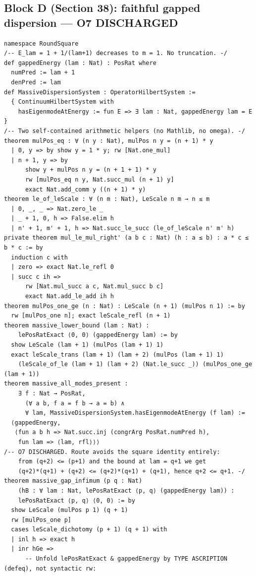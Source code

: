 \documentclass[11pt,a4paper]{article}
\theoremstyle{plain}
\theoremstyle{definition}
\theoremstyle{remark}
\renewcommand{\_}{\oldunderscore\allowbreak}
\begin{document}
\subsection{Block D (Section 38): faithful gapped dispersion --- O7 DISCHARGED}
\begin{lstlisting}
namespace RoundSquare
/-- E_lam = 1 + 1/(lam+1) decreases to m = 1. No truncation. -/
def gappedEnergy (lam : Nat) : PosRat where
  numPred := lam + 1
  denPred := lam
def MassiveDispersionSystem : OperatorHilbertSystem :=
  { ContinuumHilbertSystem with
    hasEigenmodeAtEnergy := fun E => ∃ lam : Nat, gappedEnergy lam = E }
/-- Two self-contained arithmetic helpers (no Mathlib, no omega). -/
theorem mulPos_eq : ∀ (n y : Nat), mulPos n y = (n + 1) * y
  | 0, y => by show y = 1 * y; rw [Nat.one_mul]
  | n + 1, y => by
      show y + mulPos n y = (n + 1 + 1) * y
      rw [mulPos_eq n y, Nat.succ_mul (n + 1) y]
      exact Nat.add_comm y ((n + 1) * y)
theorem le_of_leScale : ∀ (n m : Nat), LeScale n m → n ≤ m
  | 0, _, _ => Nat.zero_le _
  | _ + 1, 0, h => False.elim h
  | n' + 1, m' + 1, h => Nat.succ_le_succ (le_of_leScale n' m' h)
private theorem mul_le_mul_right' (a b c : Nat) (h : a ≤ b) : a * c ≤ b * c := by
  induction c with
  | zero => exact Nat.le_refl 0
  | succ c ih =>
      rw [Nat.mul_succ a c, Nat.mul_succ b c]
      exact Nat.add_le_add ih h
theorem mulPos_one_ge (n : Nat) : LeScale (n + 1) (mulPos n 1) := by
  rw [mulPos_one n]; exact leScale_refl (n + 1)
theorem massive_lower_bound (lam : Nat) :
    lePosRatExact ⟨0, 0⟩ (gappedEnergy lam) := by
  show LeScale (lam + 1) (mulPos (lam + 1) 1)
  exact leScale_trans (lam + 1) (lam + 2) (mulPos (lam + 1) 1)
    (leScale_of_le (lam + 1) (lam + 2) (Nat.le_succ _)) (mulPos_one_ge (lam + 1))
theorem massive_all_modes_present :
    ∃ f : Nat → PosRat,
      (∀ a b, f a = f b → a = b) ∧
      ∀ lam, MassiveDispersionSystem.hasEigenmodeAtEnergy (f lam) :=
  ⟨gappedEnergy,
   ⟨fun a b h => Nat.succ.inj (congrArg PosRat.numPred h),
    fun lam => ⟨lam, rfl⟩⟩⟩
/-- O7 DISCHARGED. Route avoids the square identity entirely:
    from (q+2) <= (p+1) and the bound at lam = q+1 we get
    (q+2)*(q+1) + (q+2) <= (q+2)*(q+1) + (q+1), hence q+2 <= q+1. -/
theorem massive_gap_infimum (p q : Nat)
    (hB : ∀ lam : Nat, lePosRatExact ⟨p, q⟩ (gappedEnergy lam)) :
    lePosRatExact ⟨p, q⟩ ⟨0, 0⟩ := by
  show LeScale (mulPos p 1) (q + 1)
  rw [mulPos_one p]
  cases leScale_dichotomy (p + 1) (q + 1) with
  | inl h => exact h
  | inr hGe =>
      -- Unfold lePosRatExact & gappedEnergy by TYPE ASCRIPTION (defeq), not syntactic rw:

\end{lstlisting}
\end{document}
